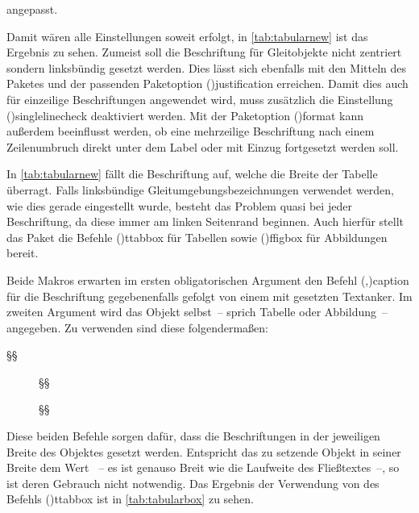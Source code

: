 \documentclass[%
  english,ngerman,%
  cdgeometry=no,DIV=12,%
  cd=false,cdfont=false,cdtitle=true,%
  headings=normal,%
  automark,%
  listof=toc,%
]{tudscrartcl}
\begin{document}
angepasst.
%
\begin{Preamble*}
\end{Preamble*}
%
\begin{table}
\end{table}%
%
Damit wären alle Einstellungen soweit erfolgt, in \autoref{tab:tabularnew} ist 
das Ergebnis zu sehen. Zumeist soll die Beschriftung für Gleitobjekte nicht 
zentriert sondern linksbündig gesetzt werden. Dies lässt sich ebenfalls mit den 
Mitteln des Paketes  und der passenden Paketoption 
\Option(){justification} erreichen. Damit dies auch für 
einzeilige Beschriftungen angewendet wird, muss zusätzlich die Einstellung 
\Option(){singlelinecheck} deaktiviert werden. Mit der 
Paketoption \Option(){format} kann außerdem beeinflusst 
werden, ob eine mehrzeilige Beschriftung nach einem Zeilenumbruch direkt unter 
dem Label oder mit Einzug fortgesetzt werden soll.
%
\begin{Preamble*}
\captionsetup{singlelinecheck=off,format=hang,justification=raggedright}
\end{Preamble*}
%
In \autoref{tab:tabularnew} fällt die Beschriftung auf, welche die Breite der 
Tabelle überragt. Falls linksbündige Gleitumgebungsbezeichnungen verwendet 
werden, wie dies gerade eingestellt wurde, besteht das Problem quasi bei jeder 
Beschriftung, da diese immer am linken Seitenrand beginnen. Auch hierfür stellt 
das Paket  die Befehle \Macro(){ttabbox} 
für Tabellen sowie \Macro(){ffigbox} für Abbildungen bereit. 

Beide Makros erwarten im ersten obligatorischen Argument den Befehl 
\Macro(,){caption} für die Beschriftung 
gegebenenfalls gefolgt von einem mit  gesetzten Textanker. Im 
zweiten Argument wird das Objekt selbst~-- sprich Tabelle oder Abbildung~-- 
angegeben. Zu verwenden sind diese folgendermaßen:
%
\begin{Hint}
\begin{table}
\ttabbox
  §§
  {\caption{§§\label{§\PName{Tabellenlabel}§}}}
\end{table}
\begin{figure}
\ffigbox
  §§
  {\caption{§§\label{§\PName{Abbildungslabel}§}}}
\end{figure}
\end{Hint}
%
Diese beiden Befehle sorgen dafür, dass die Beschriftungen in der jeweiligen 
Breite des Objektes gesetzt werden. Entspricht das zu setzende Objekt in seiner 
Breite dem Wert ~-- es ist genauso Breit wie die Laufweite 
des Fließtextes~--, so ist deren Gebrauch nicht notwendig. Das Ergebnis der 
Verwendung von des Befehls \Macro(){ttabbox} ist in 
\autoref{tab:tabularbox} zu sehen.
\end{document}
